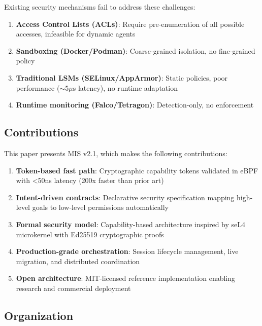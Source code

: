 \documentclass[11pt,a4paper]{article}
\begin{document}
Existing security mechanisms fail to address these challenges:

\begin{enumerate}
    \item \textbf{Access Control Lists (ACLs)}: Require pre-enumeration of all possible accesses, infeasible for dynamic agents
    \item \textbf{Sandboxing (Docker/Podman)}: Coarse-grained isolation, no fine-grained policy
    \item \textbf{Traditional LSMs (SELinux/AppArmor)}: Static policies, poor performance ($\sim$5$\mu$s latency), no runtime adaptation
    \item \textbf{Runtime monitoring (Falco/Tetragon)}: Detection-only, no enforcement
\end{enumerate}

\subsection{Contributions}

This paper presents MIS v2.1, which makes the following contributions:

\begin{enumerate}
    \item \textbf{Token-based fast path}: Cryptographic capability tokens validated in eBPF with <50ns latency (200x faster than prior art)
    
    \item \textbf{Intent-driven contracts}: Declarative security specification mapping high-level goals to low-level permissions automatically
    
    \item \textbf{Formal security model}: Capability-based architecture inspired by seL4 microkernel with Ed25519 cryptographic proofs
    
    \item \textbf{Production-grade orchestration}: Session lifecycle management, live migration, and distributed coordination
    
    \item \textbf{Open architecture}: MIT-licensed reference implementation enabling research and commercial deployment
\end{enumerate}

\subsection{Organization}
\end{document}
